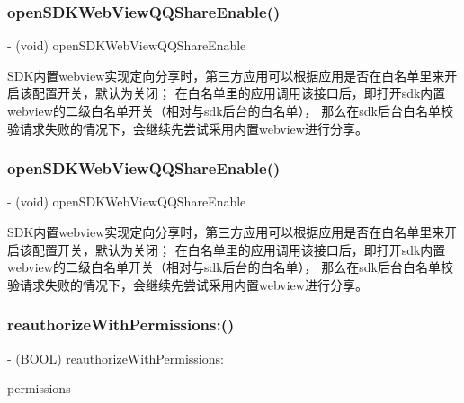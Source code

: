 \subsubsection{\texorpdfstring{open\+S\+D\+K\+Web\+View\+Q\+Q\+Share\+Enable()}{openSDKWebViewQQShareEnable()}\hspace{0.1cm}{\footnotesize\ttfamily [1/2]}}
{\footnotesize\ttfamily -\/ (void) open\+S\+D\+K\+Web\+View\+Q\+Q\+Share\+Enable \begin{DoxyParamCaption}{ }\end{DoxyParamCaption}}

S\+D\+K内置webview实现定向分享时，第三方应用可以根据应用是否在白名单里来开启该配置开关，默认为关闭； 在白名单里的应用调用该接口后，即打开sdk内置webview的二级白名单开关（相对与sdk后台的白名单）， 那么在sdk后台白名单校验请求失败的情况下，会继续先尝试采用内置webview进行分享。 \mbox{\label{interface_tencent_o_auth_aafe5fa40dc8b6ff0f7bb3d72bbecd663}} 
\subsubsection{\texorpdfstring{open\+S\+D\+K\+Web\+View\+Q\+Q\+Share\+Enable()}{openSDKWebViewQQShareEnable()}\hspace{0.1cm}{\footnotesize\ttfamily [2/2]}}
{\footnotesize\ttfamily -\/ (void) open\+S\+D\+K\+Web\+View\+Q\+Q\+Share\+Enable \begin{DoxyParamCaption}{ }\end{DoxyParamCaption}}

S\+D\+K内置webview实现定向分享时，第三方应用可以根据应用是否在白名单里来开启该配置开关，默认为关闭； 在白名单里的应用调用该接口后，即打开sdk内置webview的二级白名单开关（相对与sdk后台的白名单）， 那么在sdk后台白名单校验请求失败的情况下，会继续先尝试采用内置webview进行分享。 \mbox{\label{interface_tencent_o_auth_a0cae2d11a0ac52e1877a05c05100669d}} 
\subsubsection{\texorpdfstring{reauthorize\+With\+Permissions\+:()}{reauthorizeWithPermissions:()}\hspace{0.1cm}{\footnotesize\ttfamily [1/2]}}
{\footnotesize\ttfamily -\/ (B\+O\+OL) reauthorize\+With\+Permissions\+: \begin{DoxyParamCaption}\item[{(N\+S\+Array $\ast$)}]{permissions }\end{DoxyParamCaption}}

